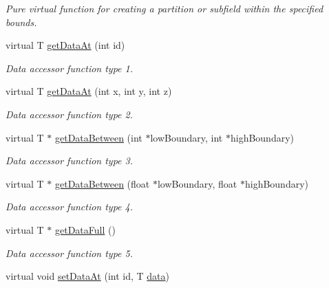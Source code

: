 \begin{DoxyCompactItemize}
\begin{DoxyCompactList}\small\item\em Pure virtual function for creating a partition or subfield within the specified bounds. \item\end{DoxyCompactList}\item 
virtual T \hyperlink{classITL__field_a9a4b41fbeafd49afde45b608b5db2c09}{getDataAt} (int id)
\begin{DoxyCompactList}\small\item\em Data accessor function type 1. \item\end{DoxyCompactList}\item 
virtual T \hyperlink{classITL__field_a40f9224e8815388882c953b914c540ff}{getDataAt} (int x, int y, int z)
\begin{DoxyCompactList}\small\item\em Data accessor function type 2. \item\end{DoxyCompactList}\item 
virtual T $\ast$ \hyperlink{classITL__field_ab3254f696ccca1b4ea1aae248bea989c}{getDataBetween} (int $\ast$lowBoundary, int $\ast$highBoundary)
\begin{DoxyCompactList}\small\item\em Data accessor function type 3. \item\end{DoxyCompactList}\item 
virtual T $\ast$ \hyperlink{classITL__field_a983bd8b95e95bf758a73fafccea62a49}{getDataBetween} (float $\ast$lowBoundary, float $\ast$highBoundary)
\begin{DoxyCompactList}\small\item\em Data accessor function type 4. \item\end{DoxyCompactList}\item 
virtual T $\ast$ \hyperlink{classITL__field_afba4c040443d3f21d3f4af30a70292be}{getDataFull} ()
\begin{DoxyCompactList}\small\item\em Data accessor function type 5. \item\end{DoxyCompactList}\item 
virtual void \hyperlink{classITL__field_ae87ee8fef9c9b9dc6a782ccbfe3605e1}{setDataAt} (int id, T \hyperlink{MainIT__regvector_8cpp_a783b2b1c03f80ec0d3ed965238d6bd65}{data})

\end{DoxyCompactItemize}
